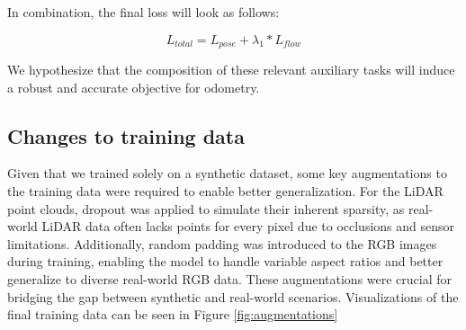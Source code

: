 \documentclass[11pt,a4paper]{article}
\begin{document}
In combination, the final loss will look as follows:

\begin{equation}
    L_{total} = L_{pose} + \lambda_1*L_{flow}
\end{equation}

We hypothesize that the composition of these relevant auxiliary tasks will induce a robust and accurate objective for odometry.

\subsection{Changes to training data}

Given that we trained solely on a synthetic dataset, some key augmentations to the training data were required to enable better generalization. For the LiDAR point clouds, dropout was applied to simulate their inherent sparsity, as real-world LiDAR data often lacks points for every pixel due to occlusions and sensor limitations. Additionally, random padding was introduced to the RGB images during training, enabling the model to handle variable aspect ratios and better generalize to diverse real-world RGB data. These augmentations were crucial for bridging the gap between synthetic and real-world scenarios. Visualizations of the final training data can be seen in Figure \ref{fig:augmentations}
\end{document}
